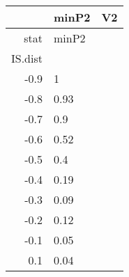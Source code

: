 \begin{table}[ht]
\centering
\begingroup\tiny
\begin{tabular}{rll}
  \hline
 & minP2 & V2 \\ 
  \hline
stat & minP2 &  \\ 
  IS.dist &  &  \\ 
  -0.9 & 1 &  \\ 
  -0.8 & 0.93 &  \\ 
  -0.7 & 0.9 &  \\ 
  -0.6 & 0.52 &  \\ 
  -0.5 & 0.4 &  \\ 
  -0.4 & 0.19 &  \\ 
  -0.3 & 0.09 &  \\ 
  -0.2 & 0.12 &  \\ 
  -0.1 & 0.05 &  \\ 
  0.1 & 0.04 &  \\ 
   \hline
\end{tabular}
\endgroup
\end{table}
